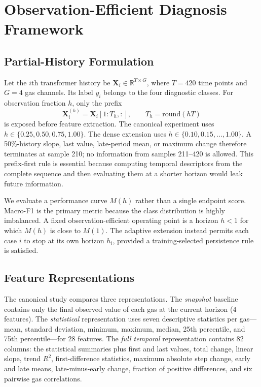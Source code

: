 \documentclass[conference]{IEEEtran}
\begin{document}
\section{Observation-Efficient Diagnosis Framework}
\subsection{Partial-History Formulation}
Let the $i$th transformer history be $\mathbf{X}_i\in\mathbb{R}^{T\times G}$, where $T=420$ time points and $G=4$ gas channels. Its label $y_i$ belongs to the four diagnostic classes. For observation fraction $h$, only the prefix
\begin{equation}
\mathbf{X}_i^{(h)}=\mathbf{X}_i[1:T_h,:],\qquad T_h=\mathrm{round}(hT)
\label{eq:prefix}
\end{equation}
is exposed before feature extraction. The canonical experiment uses $h\in\{0.25,0.50,0.75,1.00\}$. The dense extension uses $h\in\{0.10,0.15,\ldots,1.00\}$. A 50\%-history slope, last value, late-period mean, or maximum change therefore terminates at sample 210; no information from samples 211--420 is allowed. This prefix-first rule is essential because computing temporal descriptors from the complete sequence and then evaluating them at a shorter horizon would leak future information.

We evaluate a performance curve $M(h)$ rather than a single endpoint score. Macro-F1 is the primary metric because the class distribution is highly imbalanced. A fixed observation-efficient operating point is a horizon $h<1$ for which $M(h)$ is close to $M(1)$. The adaptive extension instead permits each case $i$ to stop at its own horizon $h_i$, provided a training-selected persistence rule is satisfied.

\subsection{Feature Representations}
The canonical study compares three representations. The \emph{snapshot} baseline contains only the final observed value of each gas at the current horizon (4 features). The \emph{statistical} representation uses seven descriptive statistics per gas---mean, standard deviation, minimum, maximum, median, 25th percentile, and 75th percentile---for 28 features. The \emph{full temporal} representation contains 82 columns: the statistical summaries plus first and last values, total change, linear slope, trend $R^2$, first-difference statistics, maximum absolute step change, early and late means, late-minus-early change, fraction of positive differences, and six pairwise gas correlations.
\end{document}
